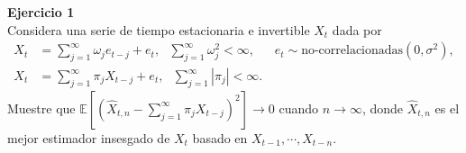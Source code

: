 \documentclass[a4paper, 11pt]{article}
\newenvironment{problem}[2][Ejercicio]
{ \begin{mdframed}[backgroundcolor= red!50] \textbf{#1 #2} \\}
	{  \end{mdframed}}
\begin{document}
	\setlength{\parskip}{\medskipamount}
	\setlength{\parindent}{0pt}
\begin{problem}{1} 
    Considera una serie de tiempo estacionaria e invertible $X_t$ dada por 
    \begin{align*}
        X_t &= \sum_{j=1}^{\infty} \omega_j e_{t-j} + e_t, \:\:\: \sum_{j=1}^{\infty} \omega_j^2 < \infty, \:\:\:\:\:\:\: e_t \sim \text{no-correlacionadas}(0,\sigma^2),\\
        X_t &= \sum_{j=1}^{\infty} \pi_j X_{t-j } + e_t, \:\:\: \sum_{j=1}^{ \infty}|\pi_j | <\infty.
    \end{align*}
    Muestre que $\mathbb{E}\left [\left(\hat{X }_{t,n }- \sum_{j=1}^{\infty}\pi_j X_{t-j }\right)^2\right ] \rightarrow 0$ cuando $n \rightarrow \infty$, donde $\hat{X }_{t,n }$ es el mejor estimador insesgado de $X_{t }$ basado en $X_{t-1}, \cdots, X_{t-n }$. 
\end{problem}
\end{document}
